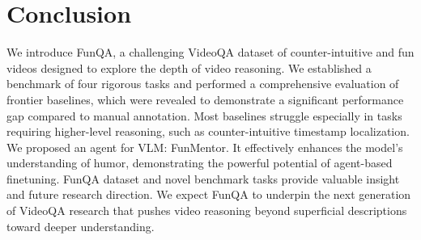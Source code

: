 \section{Conclusion}
We introduce FunQA, a challenging VideoQA dataset of counter-intuitive and fun videos designed to explore the depth of video reasoning. We established a benchmark of four rigorous tasks and performed a comprehensive evaluation of frontier baselines, which were revealed to demonstrate a significant performance gap compared to manual annotation. Most baselines struggle especially in tasks requiring higher-level reasoning, such as counter-intuitive timestamp localization. We proposed an agent for VLM: FunMentor. It effectively enhances the model's understanding of humor, demonstrating the powerful potential of agent-based finetuning. FunQA dataset and novel benchmark tasks provide valuable insight and future research direction. We expect FunQA to underpin the next generation of VideoQA research that pushes video reasoning beyond superficial descriptions toward deeper understanding. 